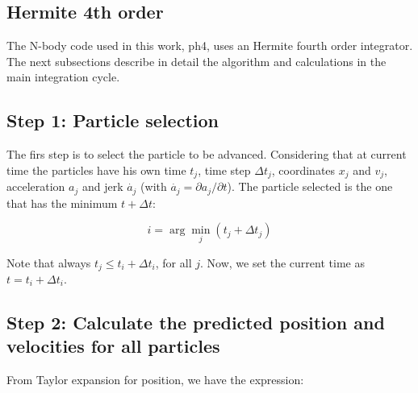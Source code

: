 \begin{appendixs}
	\section{Hermite 4th order}
	The N-body code used in this work, ph4, uses an Hermite fourth order integrator. The next subsections describe in detail the algorithm and calculations in the main integration cycle.
	
	\subsection{Step 1: Particle selection}
	The firs step is to select the particle to be advanced. Considering that at current time the particles have his own  time $t_j$, time step $\Delta t_j$, coordinates $x_j$ and $v_j$, acceleration $a_j$ and jerk $\dot{a_j}$ (with $\dot{a_j} = \partial a_j / \partial t$). The particle selected is the one that has the minimum $t + \Delta t$:
	
	\begin{equation}
		i = \arg\min_j(t_j + \Delta t_j)
	\end{equation}
	
	Note that always $t_j \leq t_i + \Delta t_i$, for all $j$. Now, we set the current time as $t = t_i + \Delta t_i$.
	
	\subsection{Step 2: Calculate the predicted position and velocities for all particles}
	
	From Taylor expansion for position, we have the expression:
	

\end{appendixs}

